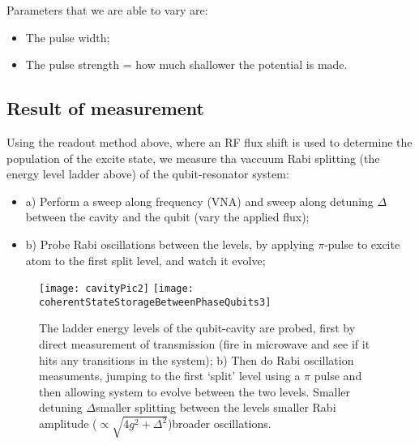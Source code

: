  	
 	Parameters that we are able to vary are:
 	\begin{itemize}
 		\item The pulse width;
 		\item The pulse strength = how much shallower the potential is made.
 	\end{itemize}
 	
 	\subsection{Result of measurement}
 	 Using the readout method above, where an RF flux shift is used to determine the population of the excite state, we measure tha vaccuum Rabi splitting (the energy level ladder above) of the qubit-resonator system:
 	 \begin{itemize}
 	 	\item a) Perform a sweep along frequency (VNA) and sweep along detuning $ \Delta $ between the cavity and the qubit (vary the applied flux);
 	 	\item b) Probe Rabi oscillations between the levels, by applying $ \pi $-pulse to excite atom to the first split level, and watch it evolve;
 	 \end{itemize}
 	 \begin{figure}[h]
 	 	\centering
 	 	\texttt{[image: cavityPic2]}
 	 	\texttt{[image: coherentStateStorageBetweenPhaseQubits3]}
 	 	\caption{The ladder energy levels of the qubit-cavity are probed, first by direct measurement of transmission (fire in microwave and see if it hits any transitions in the system); b) Then do Rabi oscillation measuments, jumping to the first `split' level using a $ \pi $ pulse and then allowing system to evolve between the two levels. Smaller detuning $ \Delta $\ra smaller splitting between the levels \ra smaller Rabi amplitude ($ \propto \sqrt{4g^2+\Delta^2} $)\ra broader oscillations. }
 	 \end{figure}
  \newpage
